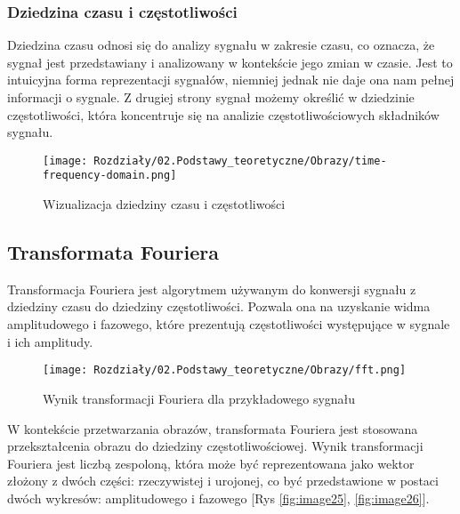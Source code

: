 \newpage
\subsubsection{Dziedzina czasu i częstotliwości}

Dziedzina czasu odnosi się do analizy sygnału w zakresie czasu, co oznacza, że sygnał jest przedstawiany i analizowany w kontekście jego zmian w czasie. Jest to intuicyjna forma reprezentacji sygnałów, niemniej jednak nie daje ona nam pełnej informacji o sygnale. Z drugiej strony sygnał możemy określić w dziedzinie częstotliwości, która koncentruje się na analizie częstotliwościowych składników sygnału.


\begin{figure}[h]
    \centering
    \texttt{[image: Rozdziały/02.Podstawy\_teoretyczne/Obrazy/time-frequency-domain.png]}
    \caption{Wizualizacja dziedziny czasu i częstotliwości}
    \label{fig:image22}
\end{figure}



\subsection*{Transformata Fouriera}

Transformacja Fouriera jest algorytmem używanym do konwersji sygnału z dziedziny czasu do dziedziny częstotliwości. Pozwala ona na uzyskanie widma amplitudowego i fazowego, które prezentują częstotliwości występujące w sygnale i ich amplitudy.

\begin{figure}[h]
    \centering
    \texttt{[image: Rozdziały/02.Podstawy\_teoretyczne/Obrazy/fft.png]}
    \caption{Wynik transformacji Fouriera dla przykładowego sygnału}
    \label{fig:image23}
\end{figure}

W kontekście przetwarzania obrazów, transformata Fouriera jest stosowana przekształcenia obrazu do dziedziny częstotliwościowej. Wynik transformacji Fouriera jest liczbą zespoloną, która może być reprezentowana jako wektor złożony z dwóch części: rzeczywistej i urojonej, co być przedstawione w postaci dwóch wykresów: amplitudowego i fazowego [Rys \ref{fig:image25}, \ref{fig:image26}].

